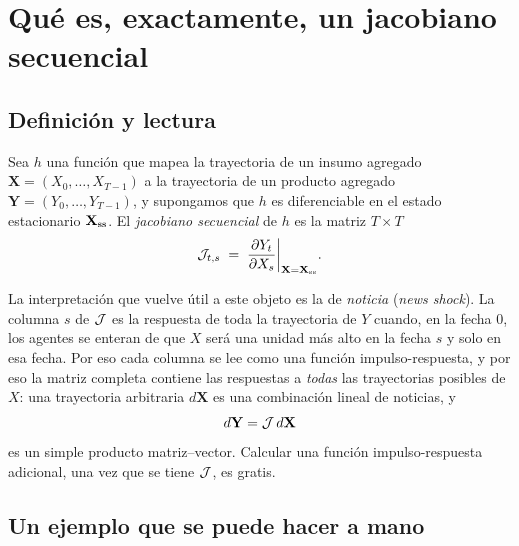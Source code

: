 \chapter{Qué es, exactamente, un jacobiano secuencial}
\label{cap:jacobiano}

\section{Definición y lectura}
\label{sec:jacobiano-def}

\begin{definicion}
Sea $h$ una función que mapea la trayectoria de un insumo agregado
$\mathbf{X} = (X_0,\dots,X_{T-1})$ a la trayectoria de un producto agregado
$\mathbf{Y} = (Y_0,\dots,Y_{T-1})$, y supongamos que $h$ es diferenciable en el
estado estacionario $\mathbf{X}_{\mathrm{ss}}$. El \emph{jacobiano secuencial} de $h$ es
la matriz $T\times T$
\begin{equation}
\mathcal{J}_{t,s} \;=\; \frac{\partial Y_t}{\partial X_s}\bigg|_{\mathbf{X}=\mathbf{X}_{\mathrm{ss}}}.
\end{equation}
\end{definicion}

La interpretación que vuelve útil a este objeto es la de \emph{noticia}
(\emph{news shock}). La columna $s$ de $\mathcal{J}$ es la respuesta de toda la
trayectoria de $Y$ cuando, en la fecha $0$, los agentes se enteran de que $X$
será una unidad más alto en la fecha $s$ y solo en esa fecha. Por eso cada
columna se lee como una función impulso-respuesta, y por eso la matriz completa
contiene las respuestas a \emph{todas} las trayectorias posibles de $X$: una
trayectoria arbitraria $d\mathbf{X}$ es una combinación lineal de noticias, y
\begin{equation}
d\mathbf{Y} = \mathcal{J}\, d\mathbf{X}
\end{equation}
es un simple producto matriz--vector. Calcular una función impulso-respuesta
adicional, una vez que se tiene $\mathcal{J}$, es gratis.

\section{Un ejemplo que se puede hacer a mano}

